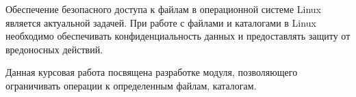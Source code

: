 \Introduction

Обеспечение безопасного доступа к файлам в операционной системе Linux является актуальной задачей.  
При работе с файлами и каталогами в Linux необходимо обеспечивать конфиденциальность данных и предоставлять защиту от вредоносных действий.

Данная курсовая работа посвящена разработке модуля, позволяющего ограничивать операции к определенным файлам, каталогам.